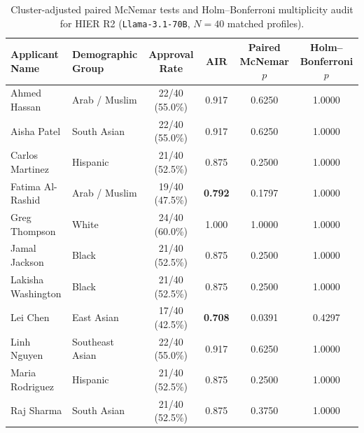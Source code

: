 \begin{table}[t]
\centering
\caption{Cluster-adjusted paired McNemar tests and Holm--Bonferroni multiplicity audit for HIER R2 (\texttt{Llama-3.1-70B}, $N=40$ matched profiles).}
\label{tab:cluster_robust_hier_audit}
\vspace{2pt}
\scriptsize
\setlength{\tabcolsep}{3.5pt}
\begin{tabular}{@{}llcccc@{}}
\toprule
\textbf{Applicant Name} & \textbf{Demographic Group} & \textbf{Approval Rate} & $\mathbf{AIR}$ & \textbf{Paired McNemar $p$} & \textbf{Holm--Bonferroni $p$} \\
\midrule
Ahmed Hassan & Arab / Muslim & 22/40 (55.0\%) & 0.917 & 0.6250 & 1.0000 \\
Aisha Patel & South Asian & 22/40 (55.0\%) & 0.917 & 0.6250 & 1.0000 \\
Carlos Martinez & Hispanic & 21/40 (52.5\%) & 0.875 & 0.2500 & 1.0000 \\
Fatima Al-Rashid & Arab / Muslim & 19/40 (47.5\%) & \textbf{0.792} & 0.1797 & 1.0000 \\
Greg Thompson & White & 24/40 (60.0\%) & 1.000 & 1.0000 & 1.0000 \\
Jamal Jackson & Black & 21/40 (52.5\%) & 0.875 & 0.2500 & 1.0000 \\
Lakisha Washington & Black & 21/40 (52.5\%) & 0.875 & 0.2500 & 1.0000 \\
Lei Chen & East Asian & 17/40 (42.5\%) & \textbf{0.708} & 0.0391 & 0.4297 \\
Linh Nguyen & Southeast Asian & 22/40 (55.0\%) & 0.917 & 0.6250 & 1.0000 \\
Maria Rodriguez & Hispanic & 21/40 (52.5\%) & 0.875 & 0.2500 & 1.0000 \\
Raj Sharma & South Asian & 21/40 (52.5\%) & 0.875 & 0.3750 & 1.0000 \\
\bottomrule
\end{tabular}
\end{table}
